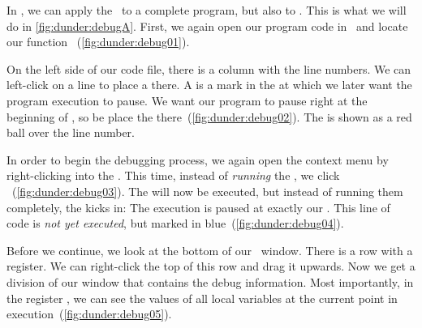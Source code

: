 %
In \pycharm, we can apply the \debugger\ to a complete program, but also to .
This is what we will do in \cref{fig:dunder:debugA}.
First, we again open our program code in \pycharm\ and locate our function ~(\cref{fig:dunder:debug01}).

On the left side of our code file, there is a column with the line numbers.
We can left-click on a line to place a  there.
A  is a mark in the  at which we later want the program execution to pause.
We want our program to pause right at the beginning of , so be place the  there~(\cref{fig:dunder:debug02}).
The  is shown as a red ball over the line number.

In order to begin the debugging process, we again open the context menu by right-clicking into the .
This time, instead of \emph{running} the , we click ~(\cref{fig:dunder:debug03}).
The  will now be executed, but instead of running them completely, the  kicks in:
The execution is paused at exactly our .
This line of code is \emph{not yet executed}, but marked in blue~(\cref{fig:dunder:debug04}).

Before we continue, we look at the bottom of our \pycharm\ window.
There is a row with a  register.
We can right-click the top of this row and drag it upwards.
Now we get a division of our window that contains the debug information.
Most importantly, in the register , we can see the values of all local variables at the current point in execution~(\cref{fig:dunder:debug05}).

